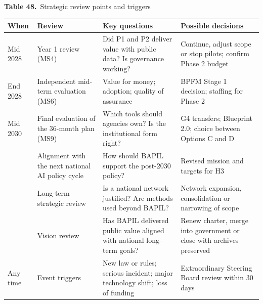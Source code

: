 \documentclass[border=10pt]{standalone}
\begin{document}
\begin{minipage}{17cm}
{\large\bfseries Table 48.}\ {\large Strategic review points and triggers}\par\vspace{7pt}
\small
{}
\begin{tabularx}{\linewidth}{@{}>{\hsize=0.494\hsize\raggedright\arraybackslash}X>{\hsize=0.899\hsize\raggedright\arraybackslash}X>{\hsize=1.348\hsize\raggedright\arraybackslash}X>{\hsize=1.258\hsize\raggedright\arraybackslash}X@{}}
\arrayrulecolor{bapilrule}\toprule
\rowcolor{white}\textbf{When} & \textbf{Review} & \textbf{Key questions} & \textbf{Possible decisions} \\
\midrule
Mid 2028 & Year 1 review (MS4) & Did P1 and P2 deliver value with public data? Is governance working? & Continue, adjust scope or stop pilots; confirm Phase 2 budget \\
End 2028 & Independent mid-term evaluation (MS6) & Value for money; adoption; quality of assurance & BPFM Stage 1 decision; staffing for Phase 2 \\
Mid 2030 & Final evaluation of the 36-month plan (MS9) & Which tools should agencies own? Is the institutional form right? & G4 transfers; Blueprint 2.0; choice between Options C and D \\
2030 & Alignment with the next national AI policy cycle & How should BAPIL support the post-2030 policy? & Revised mission and targets for H3 \\
2035 & Long-term strategic review & Is a national network justified? Are methods used beyond BAPIL? & Network expansion, consolidation or narrowing of scope \\
2041 & Vision review & Has BAPIL delivered public value aligned with national long-term goals? & Renew charter, merge into government or close with archives preserved \\
Any time & Event triggers & New law or rules; serious incident; major technology shift; loss of funding & Extraordinary Steering Board review within 30 days \\
\bottomrule
\end{tabularx}
\par\vspace{5pt}{\footnotesize\itshape Calendar dates assume that Phase 0 runs in the first half of 2027 and Month 1 is July 2027; if the plan starts later, the first three reviews move with it (Annex T).}
\par{}
\end{minipage}
\end{document}
